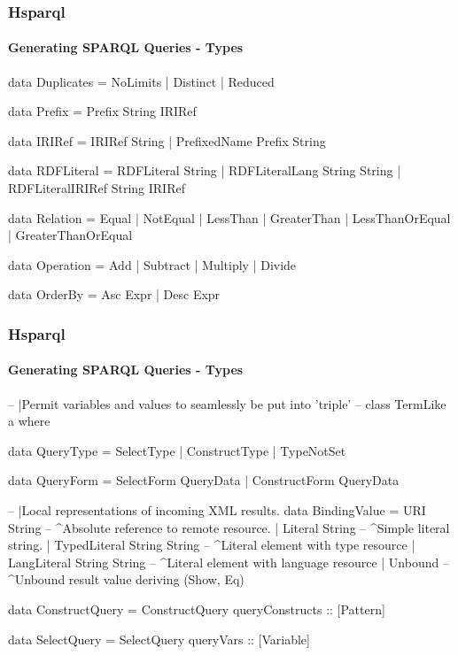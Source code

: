 \documentclass{beamer}
\begin{document}
\begin{frame}[fragile]
\frametitle{Hsparql}
\framesubtitle{Generating SPARQL Queries - Types}

\begin{haskellcode}
data Duplicates = NoLimits | Distinct | Reduced

data Prefix = Prefix String IRIRef

data IRIRef = IRIRef String
            | PrefixedName Prefix String 

data RDFLiteral = RDFLiteral String
                | RDFLiteralLang String String
                | RDFLiteralIRIRef String IRIRef

data Relation = Equal | NotEqual | LessThan | GreaterThan
       | LessThanOrEqual | GreaterThanOrEqual

data Operation = Add | Subtract | Multiply | Divide

data OrderBy = Asc Expr
             | Desc Expr
\end{haskellcode}

\end{frame}

\begin{frame}[fragile]
\frametitle{Hsparql}
\framesubtitle{Generating SPARQL Queries - Types}

\begin{haskellcode}
-- |Permit variables and values to seamlessly be put into 'triple'
-- class TermLike a where

data QueryType = SelectType | ConstructType | TypeNotSet

data QueryForm = SelectForm QueryData | ConstructForm QueryData

-- |Local representations of incoming XML results.
data BindingValue =
   URI String                   -- ^Absolute reference to remote resource.
   | Literal String             -- ^Simple literal string.
   | TypedLiteral String String -- ^Literal element with type resource
   | LangLiteral String String  -- ^Literal element with language resource
   | Unbound                    -- ^Unbound result value
  deriving (Show, Eq)

data ConstructQuery = ConstructQuery
    { queryConstructs :: [Pattern] }

data SelectQuery = SelectQuery
    { queryVars :: [Variable] }
\end{haskellcode}

\end{frame}
\end{document}
